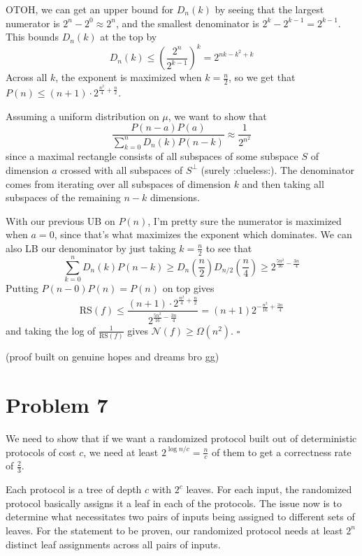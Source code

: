\documentclass[12pt]{article}
\begin{document}
OTOH, we can get an upper bound for $D_n(k)$ by seeing that the largest
numerator is $2^n-2^0 \approx 2^n$, and the smallest denominator is $2^k-2^{k-1}=2^{k-1}$.
This bounds $D_n(k)$ at the top by
\[D_n(k) \le \left(\frac{2^n}{2^{k-1}}\right)^k = 2^{nk-k^2+k}\]
Across all $k$, the exponent is maximized when $k=\frac{n}{2}$, so we get that
$P(n) \le (n+1) \cdot 2^{\frac{n^2}{4}+\frac{n}{2}}$.

Assuming a uniform distribution on $\mu$, we want to show that
\[\frac{P(n-a)P(a)}{\sum_{k=0}^{n} D_n(k)P(n-k)} \approx \frac{1}{2^{n^2}}\]
since a maximal rectangle consists of all subspaces of some subspace $S$ of dimension $a$
crossed with all subspaces of $S^\perp$ (surely :clueless:).
The denominator comes from iterating over all subspaces of dimension $k$
and then taking all subspaces of the remaining $n-k$ dimensions.

With our previous UB on $P(n)$, I'm pretty sure the numerator is maximized
when $a=0$, since that's what maximizes the exponent which dominates.
We can also LB our denominator by just taking $k=\frac{n}{2}$ to see that
\[\sum_{k=0}^{n} D_n(k)P(n-k) \ge D_n\left(\frac{n}{2}\right)D_{n/2}\left(\frac{n}{4}\right) \ge 2^{\frac{5n^2}{16}-\frac{3n}{4}}\]
Putting $P(n-0)P(n) = P(n)$ on top gives
\[\text{RS}(f) \le \frac{(n+1) \cdot 2^{\frac{n^2}{4}+\frac{n}{2}}}{2^{\frac{5n^2}{16}-\frac{3n}{4}}} = (n+1)2^{-\frac{n^2}{16}+\frac{3n}{4}}\]
and taking the log of $\frac{1}{\text{RS}(f)}$ gives $\mathcal{N}(f) \ge \Omega\left(n^2\right)$. $\square$

(proof built on genuine hopes and dreams bro gg)

\newpage

\section*{Problem 7}

We need to show that if we want a randomized protocol built out of
deterministic protocols of cost $c$, we need at least $2^{\log n/c} = \frac{n}{c}$
of them to get a correctness rate of $\frac{2}{3}$.

Each protocol is a tree of depth $c$ with $2^c$ leaves.
For each input, the randomized protocol basically assigns it a leaf in each of the protocols.
The issue now is to determine what necessitates two pairs of inputs
being assigned to different sets of leaves.
For the statement to be proven, our randomized protocol needs
at least $2^n$ distinct leaf assignments across all pairs of inputs.
\end{document}
